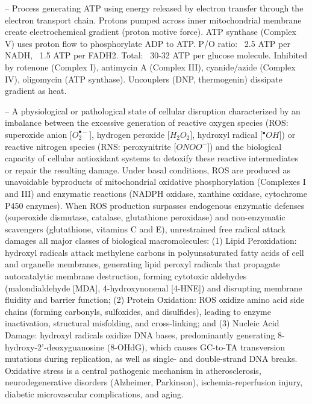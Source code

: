 -- Process generating ATP using energy released by electron transfer through the electron transport chain. Protons pumped across inner mitochondrial membrane create electrochemical gradient (proton motive force). ATP synthase (Complex V) uses proton flow to phosphorylate ADP to ATP. P/O ratio: ~2.5 ATP per NADH, ~1.5 ATP per FADH2. Total: ~30-32 ATP per glucose molecule. Inhibited by rotenone (Complex I), antimycin A (Complex III), cyanide/azide (Complex IV), oligomycin (ATP synthase). Uncouplers (DNP, thermogenin) dissipate gradient as heat.

-- A physiological or pathological state of cellular disruption characterized by an imbalance between the excessive generation of reactive oxygen species (ROS: superoxide anion [$O_2^{\bullet-}$], hydrogen peroxide [$H_2O_2$], hydroxyl radical [$^{\bullet}OH$]) or reactive nitrogen species (RNS: peroxynitrite [$ONOO^-$]) and the biological capacity of cellular antioxidant systems to detoxify these reactive intermediates or repair the resulting damage. Under basal conditions, ROS are produced as unavoidable byproducts of mitochondrial oxidative phosphorylation (Complexes I and III) and enzymatic reactions (NADPH oxidase, xanthine oxidase, cytochrome P450 enzymes). When ROS production surpasses endogenous enzymatic defenses (superoxide dismutase, catalase, glutathione peroxidase) and non-enzymatic scavengers (glutathione, vitamins C and E), unrestrained free radical attack damages all major classes of biological macromolecules: (1) Lipid Peroxidation: hydroxyl radicals attack methylene carbons in polyunsaturated fatty acids of cell and organelle membranes, generating lipid peroxyl radicals that propagate autocatalytic membrane destruction, forming cytotoxic aldehydes (malondialdehyde [MDA], 4-hydroxynonenal [4-HNE]) and disrupting membrane fluidity and barrier function; (2) Protein Oxidation: ROS oxidize amino acid side chains (forming carbonyls, sulfoxides, and disulfides), leading to enzyme inactivation, structural misfolding, and cross-linking; and (3) Nucleic Acid Damage: hydroxyl radicals oxidize DNA bases, predominantly generating 8-hydroxy-2'-deoxyguanosine (8-OHdG), which causes GC-to-TA transversion mutations during replication, as well as single- and double-strand DNA breaks. Oxidative stress is a central pathogenic mechanism in atherosclerosis, neurodegenerative disorders (Alzheimer, Parkinson), ischemia-reperfusion injury, diabetic microvascular complications, and aging.

